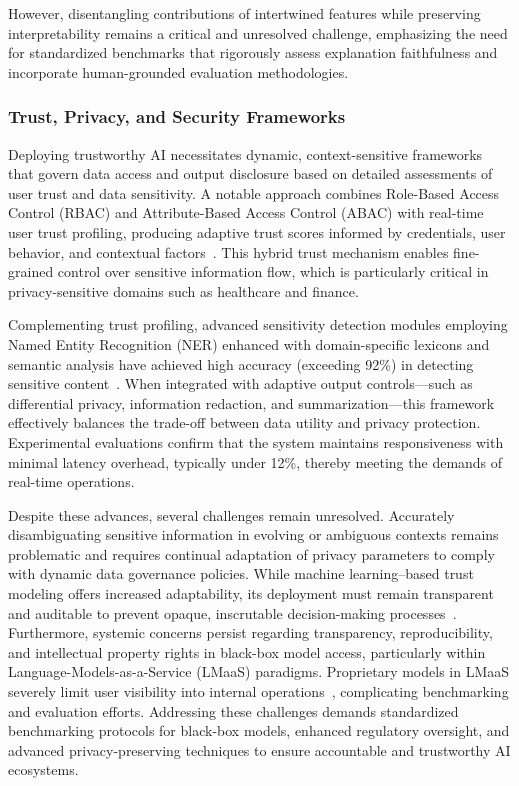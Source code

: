 \documentclass[sigconf]{acmart}
\begin{document}
However, disentangling contributions of intertwined features while preserving interpretability remains a critical and unresolved challenge, emphasizing the need for standardized benchmarks that rigorously assess explanation faithfulness and incorporate human-grounded evaluation methodologies.

\subsubsection{Trust, Privacy, and Security Frameworks}

Deploying trustworthy AI necessitates dynamic, context-sensitive frameworks that govern data access and output disclosure based on detailed assessments of user trust and data sensitivity. A notable approach combines Role-Based Access Control (RBAC) and Attribute-Based Access Control (ABAC) with real-time user trust profiling, producing adaptive trust scores informed by credentials, user behavior, and contextual factors~\cite{ref11}. This hybrid trust mechanism enables fine-grained control over sensitive information flow, which is particularly critical in privacy-sensitive domains such as healthcare and finance.

Complementing trust profiling, advanced sensitivity detection modules employing Named Entity Recognition (NER) enhanced with domain-specific lexicons and semantic analysis have achieved high accuracy (exceeding 92\%) in detecting sensitive content~\cite{ref11}. When integrated with adaptive output controls—such as differential privacy, information redaction, and summarization—this framework effectively balances the trade-off between data utility and privacy protection. Experimental evaluations confirm that the system maintains responsiveness with minimal latency overhead, typically under 12\%, thereby meeting the demands of real-time operations.

Despite these advances, several challenges remain unresolved. Accurately disambiguating sensitive information in evolving or ambiguous contexts remains problematic and requires continual adaptation of privacy parameters to comply with dynamic data governance policies. While machine learning–based trust modeling offers increased adaptability, its deployment must remain transparent and auditable to prevent opaque, inscrutable decision-making processes~\cite{ref11}. Furthermore, systemic concerns persist regarding transparency, reproducibility, and intellectual property rights in black-box model access, particularly within Language-Models-as-a-Service (LMaaS) paradigms. Proprietary models in LMaaS severely limit user visibility into internal operations~\cite{ref8}, complicating benchmarking and evaluation efforts. Addressing these challenges demands standardized benchmarking protocols for black-box models, enhanced regulatory oversight, and advanced privacy-preserving techniques to ensure accountable and trustworthy AI ecosystems.
\end{document}
